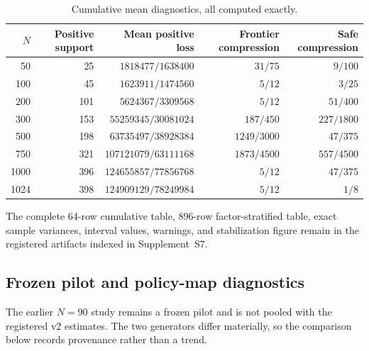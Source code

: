 \begin{table}[htbp]
\centering
\scriptsize
\setlength{\tabcolsep}{4pt}
\begin{tabular}{@{}rrrrr@{}}
\toprule
\(N\) & Positive support & Mean positive loss &
Frontier compression & Safe compression\\
\midrule
50   & 25  & \(1818477/1638400\)    & \(31/75\)     & \(9/100\)\\
100  & 45  & \(1623911/1474560\)    & \(5/12\)      & \(3/25\)\\
200  & 101 & \(5624367/3309568\)    & \(5/12\)      & \(51/400\)\\
300  & 153 & \(55259345/30081024\)  & \(187/450\)   & \(227/1800\)\\
500  & 198 & \(63735497/38928384\)  & \(1249/3000\) & \(47/375\)\\
750  & 321 & \(107121079/63111168\) & \(1873/4500\) & \(557/4500\)\\
1000 & 396 & \(124655857/77856768\) & \(5/12\)      & \(47/375\)\\
1024 & 398 & \(124909129/78249984\) & \(5/12\)      & \(1/8\)\\
\bottomrule
\end{tabular}
\caption{Cumulative mean diagnostics, all computed exactly.}
\label{tab:supp-randomized-v2-stability-means}
\end{table}

The complete 64-row cumulative table, 896-row factor-stratified table, exact
sample variances, interval values, warnings, and stabilization figure remain
in the registered artifacts indexed in Supplement~S7.

\subsection{Frozen pilot and policy-map diagnostics}

The earlier \(N=90\) study remains a frozen pilot and is not pooled with the
registered v2 estimates.  The two generators differ materially, so the
comparison below records provenance rather than a trend.

